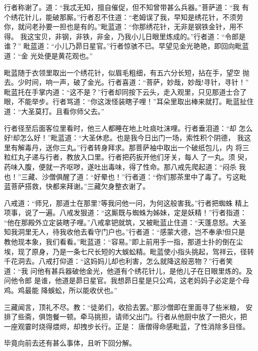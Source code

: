 行者称谢了。道：“我忒无知，擅自催促，但不知曾带甚么兵器。”菩萨道：“我
有个绣花针儿，能破那厮。”行者忍不住道：“老姆误了我，早知是绣花针，不须劳
你，就问老孙要一担也是有的。”毗蓝道：“你那绣花针，无非是钢铁金针，用不得。
我这宝贝，非钢，非铁，非金，乃我小儿日眼里炼成的。”行者道：“令郎是谁？”
毗蓝道：“小儿乃昴日星官。”行者惊骇不已。早望见金光艳艳，即回向毗蓝道：“金
光处便是黄花观也。”

毗蓝随于衣领里取出一个绣花针，似眉毛粗细，有五六分长短，拈在手，望空
抛去。少时间，响一声，破了金光。行者喜道：“菩萨，妙哉，妙哉!寻针，寻针！”
毗蓝托在手掌内道：“这不是？”行者却同按下云头，走入观里，只见那道士合了
眼，不能举步。行者骂道：“你这泼怪装瞎子哩！”耳朵里取出棒来就打。毗蓝扯住
道：“大圣莫打。且看你师父去。”

行者径至后面客位里看时，他三人都睡在地上吐痰吐沫哩。行者垂泪道：“却
怎么好!却怎么好！”毗蓝道：“大圣休悲。也是我今日出门一场，索性积个阴德，
我这里有解毒丹，送你三丸。”行者转身拜求。那菩萨袖中取出一个破纸包儿，内
将三粒红丸子递与行者，教放入口里。行者把药扳开他们牙关，每人了一丸。须
臾，药味入腹，便就一齐呕哕，遂吐出毒味，得了性命。那八戒先爬起道：“闷杀
我也！”三藏、沙僧俱醒了道：“好晕也！”行者道：“你们那茶里中了毒了。亏这毗
蓝菩萨搭救，快都来拜谢。”三藏欠身整衣谢了。

八戒道：“师兄，那道士在那里?等我问他一问，为何这般害我。”行者把蜘蛛
精上项事，说了一遍。八戒发狠道：“这厮既与蜘蛛为姊妹，定是妖精！”行者指道：
“他在那殿外立定装瞎子哩。”八戒拿钯就筑，又被毗蓝止住道：“天蓬息怒。大圣
知我洞里无人，待我收他去看守门户也。”行者道：“感蒙大德，岂不奉承!但只是
教他现本象，我们看看。”毗蓝道：“容易。”即上前用手一指，那道士扑的倒在尘
埃，现了原身，乃是一条七尺长短的大蜈蚣精。毗蓝使小指头挑起，驾祥云，径转
千花洞去。八戒打仰道：“这妈妈儿却也利害，怎么就降这般恶物？”行者笑道：“我
问他有甚兵器破他金光，他道有个绣花针儿，是他儿子在日眼里炼的。及问他令郎
是谁，他道是昴日星官。我想昴日星是只公鸡，这老妈妈子必定是个母鸡。鸡最能
降蜈蚣，所以能收伏也。”

三藏闻言，顶礼不尽。教：“徒弟们，收拾去罢。”那沙僧即在里面寻了些米粮，
安排了些斋，俱饱餐一顿。牵马挑担，请师父出门。行者从他厨中放了一把火，把
一座观霎时烧得煨烬，却拽步长行。正是：
唐僧得命感毗蓝，了性消除多目怪。

毕竟向前去还有甚么事体，且听下回分解。